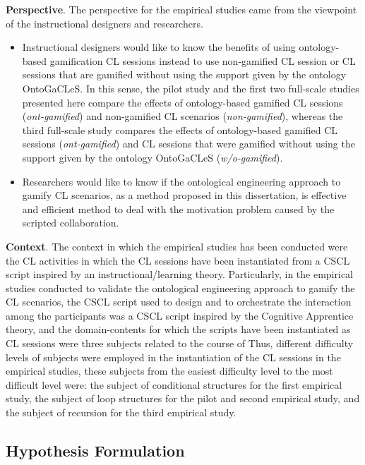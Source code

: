 \textbf{Perspective}. The perspective for the empirical studies came from the viewpoint of the instructional designers and researchers.

\begin{itemize}
\item
Instructional designers would like to know the benefits of using ontology-based gamification CL sessions instead to use non-gamified CL session or CL sessions that are gamified without using the support given by the ontology OntoGaCLeS. In this sense, the pilot study and the first two full-scale studies presented here compare the effects of ontology-based gamified CL sessions (\emph{ont-gamified}) and non-gamified CL scenarios (\emph{non-gamified}), whereas the third full-scale study compares the effects of ontology-based gamified CL sessions (\emph{ont-gamified}) and CL sessions that were gamified without using the support given by the ontology OntoGaCLeS (\emph{w/o-gamified}).

\item
Researchers would like to know if the ontological engineering approach to gamify CL scenarios, as a method proposed in this dissertation, is effective and efficient method to deal with the motivation problem caused by the scripted collaboration. 
\end{itemize}

\textbf{Context}. The context in which the empirical studies has been conducted were the CL activities in which the CL sessions have been instantiated from a CSCL script inspired by an instructional/learning theory. 
Particularly, in the empirical studies conducted to validate the ontological engineering approach to gamify the CL scenarios, the CSCL script used to design and to orchestrate the interaction among the participants was a CSCL script inspired by the Cognitive Apprentice theory, and the domain-contents for which the scripts have been instantiated as CL sessions were three subjects related to the course of  Thus, different difficulty levels of subjects were employed in the instantiation of the CL sessions in the empirical studies, these subjects from the easiest difficulty level to the most difficult level were: the subject of conditional structures for the first empirical study, the subject of loop structures for the pilot and second empirical study, and the subject of recursion for the third empirical study.


\subsection{Hypothesis Formulation}

